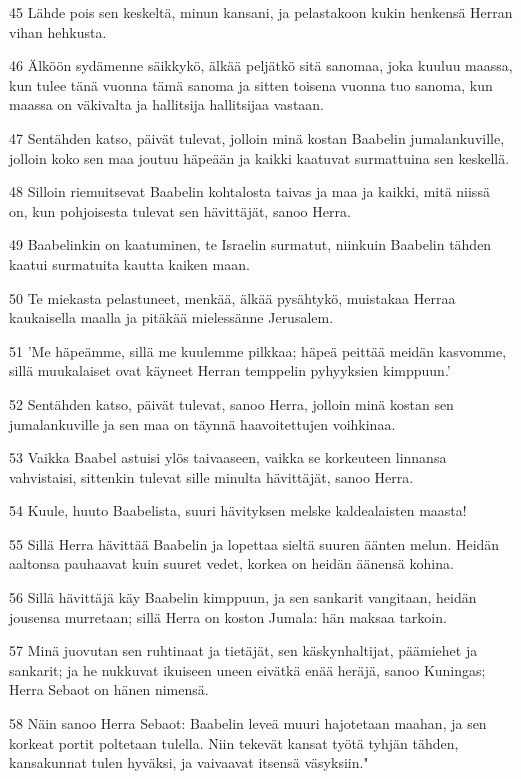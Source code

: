 \par 45 Lähde pois sen keskeltä, minun kansani, ja pelastakoon kukin henkensä Herran vihan hehkusta.
\par 46 Älköön sydämenne säikkykö, älkää peljätkö sitä sanomaa, joka kuuluu maassa, kun tulee tänä vuonna tämä sanoma ja sitten toisena vuonna tuo sanoma, kun maassa on väkivalta ja hallitsija hallitsijaa vastaan.
\par 47 Sentähden katso, päivät tulevat, jolloin minä kostan Baabelin jumalankuville, jolloin koko sen maa joutuu häpeään ja kaikki kaatuvat surmattuina sen keskellä.
\par 48 Silloin riemuitsevat Baabelin kohtalosta taivas ja maa ja kaikki, mitä niissä on, kun pohjoisesta tulevat sen hävittäjät, sanoo Herra.
\par 49 Baabelinkin on kaatuminen, te Israelin surmatut, niinkuin Baabelin tähden kaatui surmatuita kautta kaiken maan.
\par 50 Te miekasta pelastuneet, menkää, älkää pysähtykö, muistakaa Herraa kaukaisella maalla ja pitäkää mielessänne Jerusalem.
\par 51 'Me häpeämme, sillä me kuulemme pilkkaa; häpeä peittää meidän kasvomme, sillä muukalaiset ovat käyneet Herran temppelin pyhyyksien kimppuun.'
\par 52 Sentähden katso, päivät tulevat, sanoo Herra, jolloin minä kostan sen jumalankuville ja sen maa on täynnä haavoitettujen voihkinaa.
\par 53 Vaikka Baabel astuisi ylös taivaaseen, vaikka se korkeuteen linnansa vahvistaisi, sittenkin tulevat sille minulta hävittäjät, sanoo Herra.
\par 54 Kuule, huuto Baabelista, suuri hävityksen melske kaldealaisten maasta!
\par 55 Sillä Herra hävittää Baabelin ja lopettaa sieltä suuren äänten melun. Heidän aaltonsa pauhaavat kuin suuret vedet, korkea on heidän äänensä kohina.
\par 56 Sillä hävittäjä käy Baabelin kimppuun, ja sen sankarit vangitaan, heidän jousensa murretaan; sillä Herra on koston Jumala: hän maksaa tarkoin.
\par 57 Minä juovutan sen ruhtinaat ja tietäjät, sen käskynhaltijat, päämiehet ja sankarit; ja he nukkuvat ikuiseen uneen eivätkä enää heräjä, sanoo Kuningas; Herra Sebaot on hänen nimensä.
\par 58 Näin sanoo Herra Sebaot: Baabelin leveä muuri hajotetaan maahan, ja sen korkeat portit poltetaan tulella. Niin tekevät kansat työtä tyhjän tähden, kansakunnat tulen hyväksi, ja vaivaavat itsensä väsyksiin."
